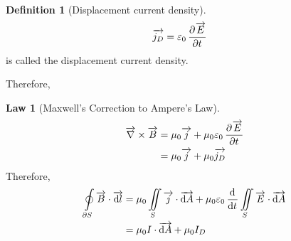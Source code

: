 \documentclass[fleqn, a4paper, 12pt, twoside]{article}
\theoremstyle{definition}
\newtheorem{definition}{Definition}
\theoremstyle{theorem}
\newtheorem{law}{Law}
\begin{document}
\begin{definition}[Displacement current density]
	\begin{align*}
		\overrightarrow{j_D} & = \varepsilon_0 \dpd{\overrightarrow{E}}{t}
	\end{align*}
	is called the displacement current density.
\end{definition}

Therefore,
\begin{law}[Maxwell's Correction to Ampere's Law]
	\begin{align*}
		\overrightarrow{\nabla} \times \overrightarrow{B} & = \mu_0 \overrightarrow{j} + \mu_0 \varepsilon_0 \dpd{\overrightarrow{E}}{t} \\
                                                                  & = \mu_0 \overrightarrow{j} + \mu_0 \overrightarrow{j_D}
	\end{align*}
	Therefore,
	\begin{align*}
		\oint\limits_{\partial S} \overrightarrow{B} \cdot \overrightarrow{\dif l} & = \mu_0 \iint\limits_{S} \overrightarrow{j} \cdot \overrightarrow{\dif A} + \mu_0 \varepsilon_0 \dod{}{t}\iint\limits_{S} \overrightarrow{E} \cdot \overrightarrow{\dif A} \\
                                                                                           & = \mu_0 I \cdot \overrightarrow{\dif A} + \mu_0 I_D
	\end{align*}
	\label{Maxwell's_Correction_to_Ampere's_Law}
\end{law}
\end{document}
